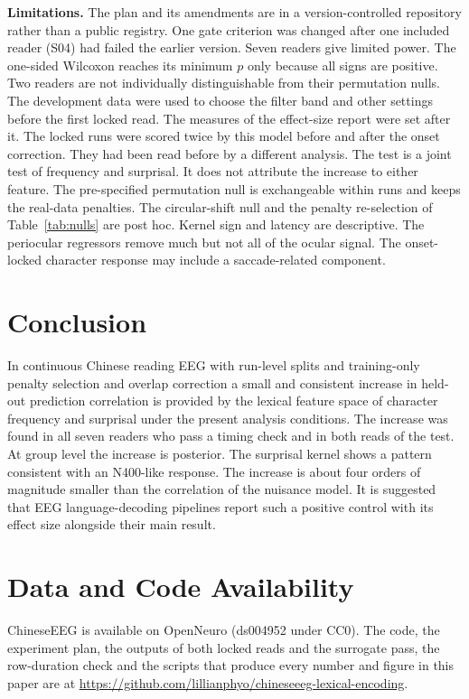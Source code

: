 \documentclass[sigconf]{acmart}
\begin{document}
\textbf{Limitations.} The plan and its amendments are in a version-controlled repository rather than a public registry. One gate criterion was changed after one included reader (S04) had failed the earlier version. Seven readers give limited power. The one-sided Wilcoxon reaches its minimum $p$ only because all signs are positive. Two readers are not individually distinguishable from their permutation nulls. The development data were used to choose the filter band and other settings before the first locked read. The measures of the effect-size report were set after it. The locked runs were scored twice by this model before and after the onset correction. They had been read before by a different analysis. The test is a joint test of frequency and surprisal. It does not attribute the increase to either feature. The pre-specified permutation null is exchangeable within runs and keeps the real-data penalties. The circular-shift null and the penalty re-selection of Table~\ref{tab:nulls} are post hoc. Kernel sign and latency are descriptive. The periocular regressors remove much but not all of the ocular signal. The onset-locked character response may include a saccade-related component.

\section{Conclusion}
In continuous Chinese reading EEG with run-level splits and training-only penalty selection and overlap correction a small and consistent increase in held-out prediction correlation is provided by the lexical feature space of character frequency and surprisal under the present analysis conditions. The increase was found in all seven readers who pass a timing check and in both reads of the test. At group level the increase is posterior. The surprisal kernel shows a pattern consistent with an N400-like response. The increase is about four orders of magnitude smaller than the correlation of the nuisance model. It is suggested that EEG language-decoding pipelines report such a positive control with its effect size alongside their main result.

\section*{Data and Code Availability}
ChineseEEG is available on OpenNeuro (ds004952 under CC0). The code, the experiment plan, the outputs of both locked reads and the surrogate pass, the row-duration check and the scripts that produce every number and figure in this paper are at \url{https://github.com/lillianphyo/chineseeeg-lexical-encoding}.



\end{document}
